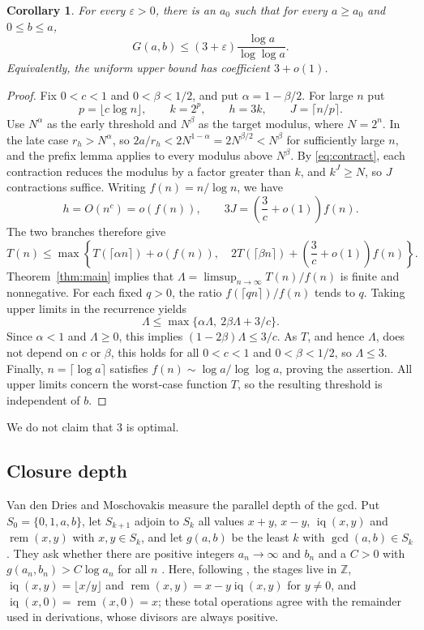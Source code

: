 \documentclass[11pt]{article}
\newtheorem{corollary}[theorem]{Corollary}
\theoremstyle{remark}
\newcommand{\rem}{\operatorname{rem}}
\begin{document}
\begin{corollary}\label{cor:three}
For every $\varepsilon>0$, there is an $a_0$ such that for every
$a\geq a_0$ and $0\leq b\leq a$,
\[
G(a,b)\leq(3+\varepsilon)\frac{\log a}{\log\log a}.
\]
Equivalently, the uniform upper bound has coefficient $3+o(1)$.
\end{corollary}
\begin{proof}
Fix $0<c<1$ and $0<\beta<1/2$, and put $\alpha=1-\beta/2$.
For large $n$ put
\[
p=\lfloor c\log n\rfloor,\qquad k=2^p,\qquad h=3k,
\qquad J=\lceil n/p\rceil.
\]
Use $N^\alpha$ as the early threshold and $N^\beta$ as the target modulus,
where $N=2^n$. In the late case $r_h>N^\alpha$, so
$2a/r_h<2N^{1-\alpha}=2N^{\beta/2}<N^\beta$ for sufficiently large $n$, and
the prefix lemma applies to every modulus above $N^\beta$. By
\eqref{eq:contract}, each contraction reduces the modulus by a factor
greater than $k$, and $k^J\geq N$, so $J$ contractions suffice.
Writing $f(n)=n/\log n$, we have
\[
h=O(n^{c})=o(f(n)),\qquad
3J=\left(\frac3c+o(1)\right)f(n).
\]
The two branches therefore give
\[
T(n)\leq\max\left\{
 T(\lceil\alpha n\rceil)+o(f(n)),\quad
 2T(\lceil\beta n\rceil)+\left(\frac3c+o(1)\right)f(n)
\right\}.
\]
Theorem~\ref{thm:main} implies that
$\Lambda=\limsup_{n\to\infty}T(n)/f(n)$ is finite and nonnegative.
For each fixed $q>0$, the ratio $f(\lceil qn\rceil)/f(n)$ tends to $q$.
Taking upper limits in the recurrence yields
\[
\Lambda\leq\max\{\alpha \Lambda,\ 2\beta \Lambda+3/c\}.
\]
Since $\alpha<1$ and $\Lambda\geq0$, this implies
$(1-2\beta)\Lambda\leq3/c$. As $T$, and hence $\Lambda$, does not depend on
$c$ or $\beta$, this holds for all $0<c<1$ and $0<\beta<1/2$, so
$\Lambda\leq3$. Finally, $n=\lceil\log a\rceil$ satisfies
$f(n)\sim\log a/\log\log a$, proving the assertion. All upper limits concern
the worst-case function $T$, so the resulting threshold is independent of $b$.
\end{proof}
We do not claim that $3$ is optimal.

\subsection{Closure depth}
Van den Dries and Moschovakis \cite{vddm2009} measure the parallel depth of the gcd. Put
$S_0=\{0,1,a,b\}$, let $S_{k+1}$ adjoin to $S_k$ all values $x+y$, $x-y$,
$\operatorname{iq}(x,y)$ and $\rem(x,y)$ with $x,y\in S_k$, and let $g(a,b)$
be the least $k$ with $\gcd(a,b)\in S_k$ \cite[p.~2:6]{vddm2009}. They ask
whether there are positive integers $a_n\to\infty$ and $b_n$ and a $C>0$
with $g(a_n,b_n)>C\log a_n$ for all $n$
\cite[Open Problem, p.~2:11]{vddm2009}. Here, following \cite[p.~2:4]{vddm2009},
the stages live in $\mathbb Z$, $\operatorname{iq}(x,y)=\lfloor x/y\rfloor$
and $\rem(x,y)=x-y\operatorname{iq}(x,y)$ for $y\neq0$, and
$\operatorname{iq}(x,0)=\rem(x,0)=x$; these total operations agree with the
remainder used in derivations, whose divisors are always positive.
\end{document}
